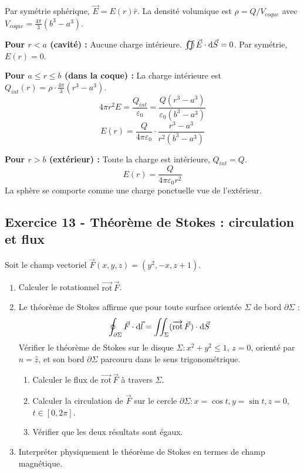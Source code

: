\documentclass[12pt,a4paper]{article}
\begin{document}
\begin{boitecorrige}
Par symétrie sphérique, $\vec{E} = E(r)\hat{r}$. La densité volumique est $\rho = Q/V_{coque}$ avec $V_{coque} = \frac{4\pi}{3}(b^3-a^3)$.

\textbf{Pour $r < a$ (cavité) :} Aucune charge intérieure. $\oiint \vec{E}\cdot\d\vec{S} = 0$. Par symétrie, $E(r) = 0$.

\textbf{Pour $a \leq r \leq b$ (dans la coque) :} La charge intérieure est $Q_{int}(r) = \rho\cdot\frac{4\pi}{3}(r^3-a^3)$.
\[
4\pi r^2 E = \frac{Q_{int}}{\varepsilon_0} = \frac{Q(r^3-a^3)}{\varepsilon_0(b^3-a^3)}
\]
\[
\boxed{E(r) = \frac{Q}{4\pi\varepsilon_0}\cdot\frac{r^3-a^3}{r^2(b^3-a^3)}}
\]

\textbf{Pour $r > b$ (extérieur) :} Toute la charge est intérieure, $Q_{int} = Q$.
\[
\boxed{E(r) = \frac{Q}{4\pi\varepsilon_0 r^2}}
\]
La sphère se comporte comme une charge ponctuelle vue de l'extérieur.
\end{boitecorrige}


\subsection*{Exercice 13 - Théorème de Stokes : circulation et flux \niveau{\difficile}}

\begin{boiteexercice}
Soit le champ vectoriel $\vec{F}(x,y,z) = (y^2, -x, z+1)$.

\begin{enumerate}
  \item Calculer le rotationnel $\overrightarrow{\text{rot}}\,\vec{F}$.
  \item Le théorème de Stokes affirme que pour toute surface orientée $\Sigma$ de bord $\partial\Sigma$ :
  \[
  \oint_{\partial\Sigma} \vec{F}\cdot\mathrm{d}\vec{l} = \iint_\Sigma (\overrightarrow{\text{rot}}\,\vec{F})\cdot\mathrm{d}\vec{S}
  \]
  Vérifier le théorème de Stokes sur le disque $\Sigma : x^2+y^2 \leq 1$, $z=0$, orienté par $\hat{n} = \hat{z}$, et son bord $\partial\Sigma$ parcouru dans le sens trigonométrique.
  \begin{enumerate}[label=(\alph*)]
    \item Calculer le flux de $\overrightarrow{\text{rot}}\,\vec{F}$ à travers $\Sigma$.
    \item Calculer la circulation de $\vec{F}$ sur le cercle $\partial\Sigma : x = \cos t, y = \sin t, z = 0$, $t\in[0,2\pi]$.
    \item Vérifier que les deux résultats sont égaux.
  \end{enumerate}
  \item Interpréter physiquement le théorème de Stokes en termes de champ magnétique.
\end{enumerate}
\end{boiteexercice}
\end{document}
